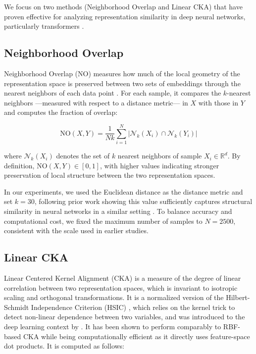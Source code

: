 We focus on two methods (Neighborhood Overlap and Linear CKA) that have proven effective for analyzing representation similarity in deep neural networks, particularly transformers \cite{doimoHierarchicalNucleationDeep2020, basileIntrinsicDimensionCorrelation2025, kornblithSimilarityNeuralNetwork2019}.

\subsection{Neighborhood Overlap}\label{sec:no}

Neighborhood Overlap (NO) measures how much of the local geometry of the representation space is preserved between two sets of embeddings through the nearest neighbors of each data point \cite{doimoHierarchicalNucleationDeep2020,klabundeSimilarityNeuralNetwork2025}. For each sample, it compares the $k$-nearest neighbors ---measured with respect to a distance metric--- in $X$ with those in $Y$ and computes the fraction of overlap:

\begin{equation*}
    \text{NO}(X,Y) = \frac{1}{Nk} \sum_{i=1}^{N} |\mathcal{N}_k(X_i) \cap \mathcal{N}_k(Y_i)|
    \label{eq:no}
\end{equation*}

where $\mathcal{N}_k(X_i)$ denotes the set of $k$ nearest neighbors of sample $X_i \in \mathbb{R}^d$. By definition, $\text{NO}(X,Y) \in [0,1]$, with higher values indicating stronger preservation of local structure between the two representation spaces.

In our experiments, we used the Euclidean distance as the distance metric and set $k=30$, following prior work showing this value sufficiently captures structural similarity in neural networks in a similar setting \cite{doimoHierarchicalNucleationDeep2020, doimoRepresentationLandscapeFewShot, serraNarrowGateLocalizeda}. To balance accuracy and computational cost, we fixed the maximum number of samples to $N=2500$, consistent with the scale used in earlier studies.

\subsection{Linear CKA}

Linear Centered Kernel Alignment (CKA) \cite{kornblithSimilarityNeuralNetwork2019, davariReliabilityCKASimilarity2022, klabundeSimilarityNeuralNetwork2025} is a measure of the degree of linear correlation between two representation spaces, which is invariant to isotropic scaling and orthogonal transformations. It is a normalized version of the Hilbert-Schmidt Independence Criterion (HSIC) \cite{grettonMeasuringStatisticalDependence2005}, which relies on the kernel trick to detect non-linear dependence between two variables, and was introduced to the deep learning context by \cite{kornblithSimilarityNeuralNetwork2019}. It has been shown to perform comparably to RBF-based CKA while being computationally efficient as it directly uses feature-space dot products. It is computed as follows:

